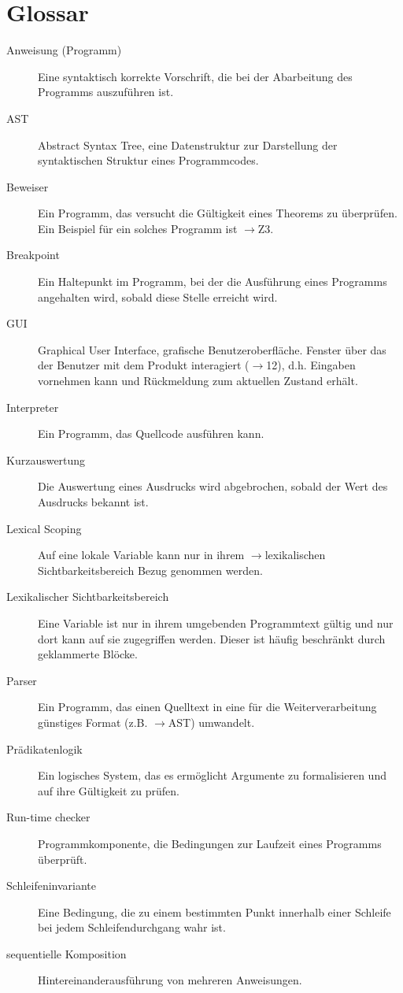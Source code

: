 \documentclass[a4paper,10pt]{article}
\begin{document}
\newpage
\section{Glossar}
\begin{description}
\item[Anweisung (Programm)] Eine syntaktisch korrekte Vorschrift, die bei der Abarbeitung des Programms auszuf\"{u}hren ist.
\item[AST] Abstract Syntax Tree, eine Datenstruktur zur Darstellung der syntaktischen Struktur eines Programmcodes.
\item[Beweiser] Ein Programm, das versucht die G\"{u}ltigkeit eines Theorems zu \"{u}berpr\"{u}fen. Ein Beispiel f\"{u}r ein solches Programm ist $\to$Z3.
\item[Breakpoint] Ein Haltepunkt im Programm, bei der die Ausf\"{u}hrung eines Programms angehalten wird, sobald diese Stelle erreicht wird.
\item[GUI] Graphical User Interface, grafische Benutzeroberfl\"{a}che. Fenster über das der Benutzer mit dem Produkt interagiert ($\to$12), d.h. Eingaben vornehmen kann und Rückmeldung zum aktuellen Zustand erhält.
\item[Interpreter] Ein Programm, das Quellcode ausf\"{u}hren kann.
\item[Kurzauswertung] Die Auswertung eines Ausdrucks wird abgebrochen, sobald der Wert des Ausdrucks bekannt ist.
\item[Lexical Scoping] Auf eine lokale Variable kann nur in ihrem $\to$lexikalischen Sichtbarkeitsbereich Bezug genommen werden.
\item[Lexikalischer Sichtbarkeitsbereich] Eine Variable ist nur in ihrem umgebenden Programmtext gültig und nur dort kann auf sie zugegriffen werden. Dieser ist häufig beschränkt durch geklammerte Blöcke.
\item[Parser] Ein Programm, das einen Quelltext in eine f\"{u}r die Weiterverarbeitung g\"{u}nstiges Format (z.B. $\to$AST) umwandelt.
\item[Pr\"{a}dikatenlogik] Ein logisches System, das es erm\"{o}glicht Argumente zu formalisieren und auf ihre G\"{u}ltigkeit zu pr\"{u}fen.
\item[Run-time checker] Programmkomponente, die Bedingungen zur Laufzeit eines Programms \"{u}berpr\"{u}ft.
\item[Schleifeninvariante] Eine Bedingung, die zu einem bestimmten Punkt innerhalb einer Schleife bei jedem Schleifendurchgang wahr ist.
\item[sequentielle Komposition] Hintereinanderausf\"{u}hrung von mehreren Anweisungen.

\end{description}
\end{document}

